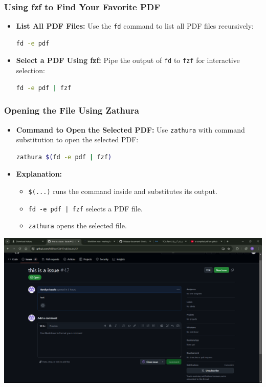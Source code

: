 \documentclass{article}
\begin{document}
\subsubsection{Using fzf to Find Your Favorite PDF}
\begin{itemize}
    \item \textbf{List All PDF Files:}
    Use the \texttt{fd} command to list all PDF files recursively:
    \begin{lstlisting}[language=bash]
    fd -e pdf
    \end{lstlisting}
    \item \textbf{Select a PDF Using fzf:}
    Pipe the output of \texttt{fd} to \texttt{fzf} for interactive selection:
    \begin{lstlisting}[language=bash]
    fd -e pdf | fzf
    \end{lstlisting}
\end{itemize}

\subsubsection{Opening the File Using Zathura}
\begin{itemize}
    \item \textbf{Command to Open the Selected PDF:}
    Use \texttt{zathura} with command substitution to open the selected PDF:
    \begin{lstlisting}[language=bash]
    zathura $(fd -e pdf | fzf)
    \end{lstlisting}
    \item \textbf{Explanation:}
    \begin{itemize}
        \item \texttt{\$(...)} runs the command inside and substitutes its output.
        \item \texttt{fd -e pdf | fzf} selects a PDF file.
        \item \texttt{zathura} opens the selected file.
    \end{itemize}
\end{itemize}

\includegraphics{image.png}
\end{document}
